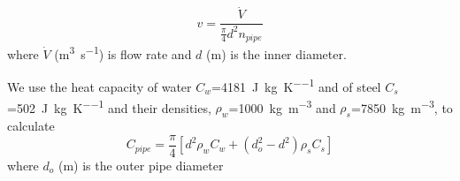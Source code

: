 \begin{equation}
  v = \frac{\dot{V}}{\frac{\pi}{4} d^2 n_{pipe}}
\end{equation}
where $\dot{V}$ (\si{\cubic\meter\per\second}) is flow rate and $d$ (\si{\meter}) is the inner diameter.

We use the heat capacity of water $C_w$=\SI{4181}{\joule\per\kg\per\kelvin} and of steel $C_s$=\SI{502}{\joule\per\kg\per\kelvin} and their densities, $\rho_w$=\SI{1000}{\kg\per\cubic\meter} and $\rho_s$=\SI{7850}{\kg\per\cubic\meter}, to calculate
\begin{equation}
  C_{pipe} = \frac{\pi}{4} \left[ d^2\rho_w C_w + (d_o^2-d^2)\rho_s C_s\right]
\end{equation}
where $d_o$ (\si{\meter}) is the outer pipe diameter
